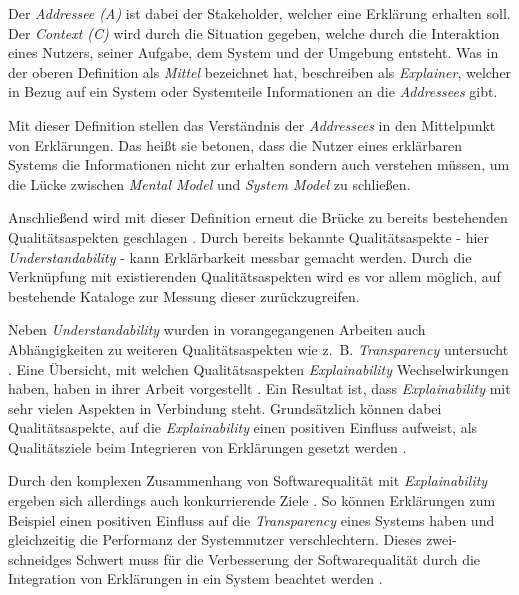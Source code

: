 \smallskip

Der \textit{Addressee (A)} ist dabei der Stakeholder, welcher eine Erklärung erhalten soll. Der \textit{Context (C)} wird durch die Situation gegeben, welche durch die Interaktion eines Nutzers, seiner Aufgabe, dem System und der Umgebung entsteht. Was \citeauthor{kohl_explainability_2019} in der oberen Definition als \textit{Mittel} bezeichnet hat, beschreiben \citeauthor{chazette_end-users_nodate} als \textit{Explainer}, welcher in Bezug auf ein 
System oder Systemteile Informationen an die \textit{Addressees} gibt.

Mit dieser Definition stellen \citeauthor{chazette_knowledge_nodate} das Verständnis der \textit{Addressees} in den Mittelpunkt von Erklärungen. Das heißt sie betonen, dass die Nutzer eines erklärbaren Systems die Informationen nicht zur erhalten sondern auch verstehen müssen, um die Lücke zwischen \textit{Mental Model} und \textit{System Model} zu schließen.

Anschließend wird mit dieser Definition erneut die Brücke zu bereits bestehenden Qualitätsaspekten geschlagen \cite{chazette_end-users_nodate}. Durch bereits bekannte Qualitätsaspekte - hier \textit{Understandability} - kann Erklärbarkeit messbar gemacht werden. Durch die Verknüpfung mit existierenden Qualitätsaspekten wird es vor allem möglich, auf bestehende Kataloge zur Messung dieser zurückzugreifen.

Neben \textit{Understandability} wurden in vorangegangenen Arbeiten auch Abhängigkeiten zu weiteren Qualitätsaspekten wie z.~B. \textit{Transparency} untersucht \cite{wang_integration_2020}. Eine Übersicht, mit welchen Qualitätsaspekten \textit{Explainability} Wechselwirkungen haben, haben \citeauthor{chazette_knowledge_nodate} in ihrer Arbeit vorgestellt \cite{chazette_knowledge_nodate}. Ein Resultat ist, dass \textit{Explainability} mit sehr vielen Aspekten in Verbindung steht. Grundsätzlich können dabei Qualitätsaspekte, auf die \textit{Explainability} einen positiven Einfluss aufweist, als Qualitätsziele beim Integrieren von Erklärungen gesetzt werden \cite{wang_integration_2020}.

Durch den komplexen Zusammenhang von Softwarequalität mit \textit{Explainability} ergeben sich allerdings auch konkurrierende Ziele \cite{chazette_end-users_nodate}. So können Erklärungen zum Beispiel einen positiven Einfluss auf die \textit{Transparency} eines Systems haben und gleichzeitig die Performanz der Systemnutzer verschlechtern. Dieses zwei-schneidges Schwert muss für die Verbesserung der Softwarequalität durch die Integration von Erklärungen in ein System beachtet werden \cite[vgl.][]{wang_integration_2020}.

